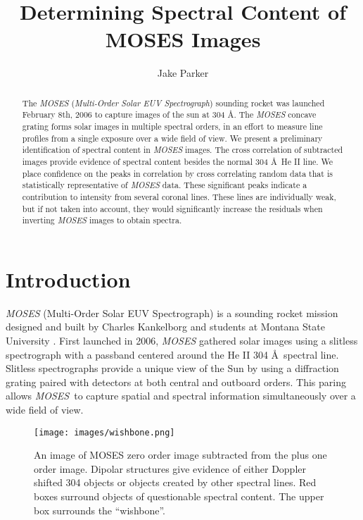 \documentclass[]{aastex6}
\newcommand{\MOSES}{\textit{MOSES}}
\begin{document}
	\title{Determining  Spectral Content of MOSES Images}
	\author{Jake Parker}
	
\begin{abstract}
The \textit{MOSES} (\textit{Multi-Order Solar EUV Spectrograph})  sounding rocket was launched February 8th, 2006 to capture images of the sun at 304 \AA. The \textit{MOSES} concave grating forms solar images in multiple spectral orders, in an effort to measure line profiles from a single exposure over a wide field of view. We present a preliminary identification of spectral content in \textit{MOSES} images. The cross correlation of subtracted images provide evidence of spectral content besides the normal 304 \AA \ He II line. We place confidence on the peaks in correlation by cross correlating random data that is statistically representative of \textit{MOSES} data. These significant peaks indicate a contribution to intensity from several coronal lines.  These lines are individually weak, but if not taken into account, they would significantly increase the residuals when inverting \textit{MOSES} images to obtain spectra.

\end{abstract}

\section{Introduction}

\textit{MOSES} (Multi-Order Solar EUV Spectrograph) is a sounding rocket mission designed and built by Charles Kankelborg and students at Montana State University  \citep{Kan01}.  First launched in 2006, \textit{MOSES} gathered solar images using a slitless spectrograph with a passband centered around the He II 304 \AA \ spectral line.  Slitless spectrographs provide a unique view of the Sun by using a diffraction grating paired with detectors at both central and outboard orders. This paring allows \MOSES \ to capture spatial and spectral information simultaneously over a wide field of view.

\begin{figure*}[t]
\centering
\texttt{[image: images/wishbone.png]}
\caption{An image of MOSES zero order image subtracted from the plus one order image.  Dipolar structures give evidence of either Doppler shifted 304 objects or objects created by other spectral lines. Red boxes surround objects of questionable spectral content.  The upper box surrounds the ``wishbone''.}
\end{figure*}	
\end{document}
